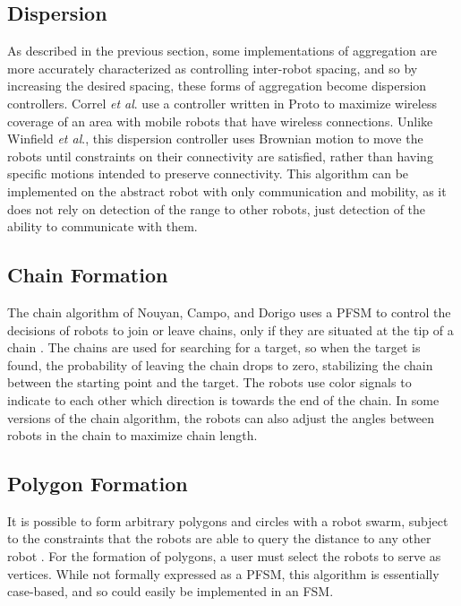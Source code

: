 \documentclass[]{article}
\begin{document}
\subsection{Dispersion}

As described in the previous section, some implementations of aggregation are more accurately characterized as controlling inter-robot spacing, and so by increasing the desired spacing, these forms of aggregation become dispersion controllers. 
Correl \textit{et al}. use a controller written in Proto to maximize wireless coverage of an area with mobile robots that have wireless connections.
Unlike Winfield \textit{et al}., this dispersion controller uses Brownian motion to move the robots until constraints on their connectivity are satisfied, rather than having specific motions intended to preserve connectivity. 
This algorithm can be implemented on the abstract robot with only communication and mobility, as it does not rely on detection of the range to other robots, just detection of the ability to communicate with them. 

\subsection{Chain Formation}

The chain algorithm of Nouyan, Campo, and Dorigo uses a PFSM to control the decisions of robots to join or leave chains, only if they are situated at the tip of a chain \cite{nouyan2008path}. 
The chains are used for searching for a target, so when the target is found, the probability of leaving the chain drops to zero, stabilizing the chain between the starting point and the target. 
The robots use color signals to indicate to each other which direction is towards the end of the chain. 
In some versions of the chain algorithm, the robots can also adjust the angles between robots in the chain to maximize chain length. 

\subsection{Polygon Formation}

It is possible to form arbitrary polygons and circles with a robot swarm, subject to the constraints that the robots are able to query the distance to any other robot \cite{sugihara1996distributed}.
For the formation of polygons, a user must select the robots to serve as vertices. 
While not formally expressed as a PFSM, this algorithm is essentially case-based, and so could easily be implemented in an FSM. 
\end{document}
